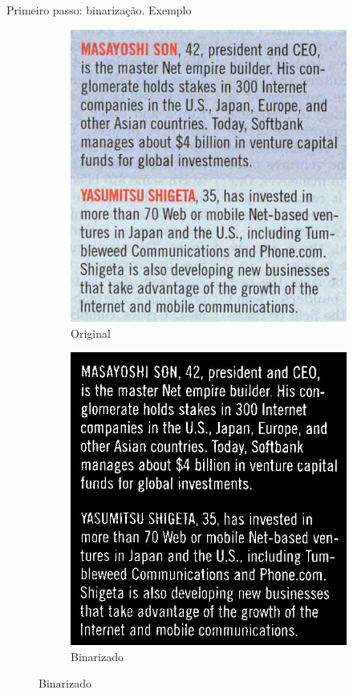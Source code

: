 \documentclass{beamer}
\begin{document}
\begin{frame}[allowframebreaks]{Primeiro passo: binarização. Exemplo}
\begin{figure}
    \centering
    \begin{subfigure}[]{0.49\textwidth}
        \centering
        \includegraphics[width=\textwidth]{images/2.jpg}
        \caption{Original}
    \end{subfigure}
    \begin{subfigure}[]{0.49\textwidth}
        \centering
        \includegraphics[width=\textwidth]{images/2_bin.jpg}
        \caption{Binarizado}
    \end{subfigure}
\end{figure}

\end{frame}
\end{document}

